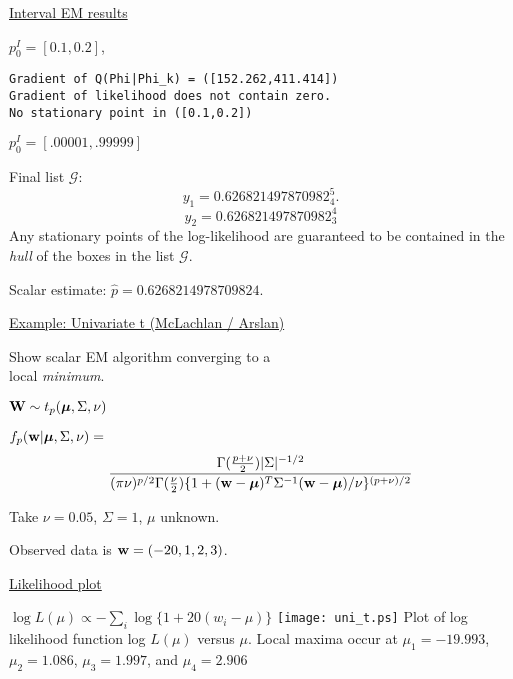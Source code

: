 \documentclass{slides}
\begin{document}
\begin{slide}
\begin{center}
\underline{Interval EM results}
\end{center}
$p_0^I=[0.1,0.2]$, 

\begin{verbatim}
Gradient of Q(Phi|Phi_k) = ([152.262,411.414])
Gradient of likelihood does not contain zero.
No stationary point in ([0.1,0.2])
\end{verbatim}

$p_0^I = [.00001,.99999]$

Final list $\mathcal{G}$:
$$y_1 = 0.626821497870982_4^5.$$
$$y_2 = 0.626821497870982_3^4$$
Any stationary points of the log-likelihood are guaranteed to be
contained in the {\it hull} of the boxes in the list $\mathcal{G}$.  

Scalar estimate: $\hat{p} = 0.6268214978709824$.
\end{slide}
\begin{slide}
\begin{center}
\underline{Example: Univariate t  (McLachlan / Arslan)}
\end{center}
Show scalar EM algorithm converging to a \\
local {\it minimum}.  

${\bf W} \sim t_p(\mbox{\boldmath $\mu$}, \Sigma, \nu)$

$
f_p({\bf w} | \mbox{\boldmath $\mu$}, \Sigma, \nu) = 
$
$$\frac{\Gamma(\frac{p+\nu}{2})|\Sigma|^{-1/2}}
  {(\pi \nu)^{p/2} \Gamma(\frac{\nu}{2}) 
  \{ 1 + ({\bf w}-\mbox{\boldmath $\mu$})^T\Sigma^{-1}({\bf w}-\mbox{\boldmath $\mu$}) / \nu\}^{(p+\nu)/2}}
$$

Take $\nu=0.05$, $\Sigma=1$, $\mu$ unknown.  

Observed data is ${\bf w}=(-20,1,2,3)$. 
\end{slide}
\begin{slide}
\begin{center}
\underline{Likelihood plot}

$\log L(\mu) \propto -\sum_i \log \{1+20(w_i - \mu)\}$
\resizebox{15 cm}{15 cm} {\texttt{[image: uni\_t.ps]}}
Plot of log likelihood function log $L(\mu)$ versus $\mu$.  Local 
maxima occur at $\mu_1= -19.993$, $\mu_2= 1.086$, $\mu_3=1.997$, 
and $\mu_4=2.906$
\end{center}
\end{slide}
\end{document}
